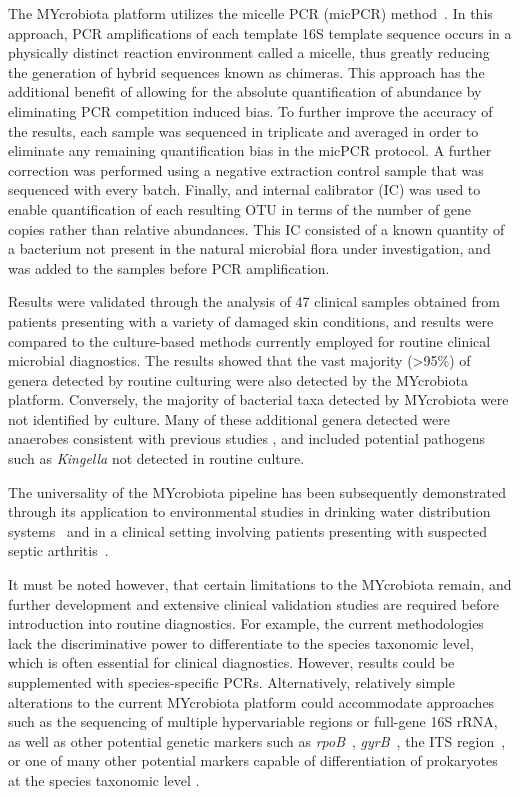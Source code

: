 The MYcrobiota platform utilizes the micelle PCR (micPCR) method~\cite{boers2015micelle,boers2017novel}. In this approach, PCR amplifications of each template 16S template sequence occurs in a physically distinct reaction environment called a micelle, thus greatly reducing the generation of hybrid sequences known as chimeras. This approach has the additional benefit of allowing for the absolute quantification of abundance by eliminating PCR competition induced bias. To further improve the accuracy of the results, each sample was sequenced in triplicate and averaged in order to eliminate any remaining quantification bias in the micPCR protocol. A further correction was performed using a negative extraction control sample that was sequenced with every batch. Finally, and internal calibrator (IC) was used to enable quantification of each resulting OTU in terms of the number of gene copies rather than relative abundances. This IC consisted of a known quantity of a bacterium not present in the natural microbial flora under investigation, and was added to the samples before PCR amplification.

Results were validated through the analysis of 47 clinical samples obtained from patients presenting with a variety of damaged skin conditions, and results were compared to the culture-based methods currently employed for routine clinical microbial diagnostics. The results showed that the vast majority (>95\%) of genera detected by routine culturing were also detected by the MYcrobiota platform. Conversely, the majority of bacterial taxa detected by MYcrobiota were not identified by culture. Many of these additional genera detected were anaerobes consistent with previous studies \cite{price2009community}, and included potential pathogens such as \emph{Kingella} not detected in routine culture.

The universality of the MYcrobiota pipeline has been subsequently demonstrated through its application to environmental studies in drinking water distribution systems~\cite{boers2018monitoring} and in a clinical setting involving patients presenting with suspected septic arthritis~\cite{boers2018detection}.

It must be noted however, that certain limitations to the MYcrobiota remain, and further development and extensive clinical validation studies are required before introduction into routine diagnostics. For example, the current methodologies lack the discriminative power to differentiate to the species taxonomic level, which is often essential for clinical diagnostics. However, results could be supplemented with species-specific PCRs. Alternatively, relatively simple alterations to the current MYcrobiota platform could accommodate approaches such as the sequencing of multiple hypervariable regions or full-gene 16S rRNA, as well as other potential genetic markers such as \emph{rpoB}~\cite{adekambi2009rpob}, \emph{gyrB}~\cite{yamamoto1995pcr}, the ITS region~\cite{schoch2012nuclear}, or one of many other potential markers capable of differentiation of prokaryotes at the species taxonomic level \cite{lan2016marker,sabat2017targeted}.

